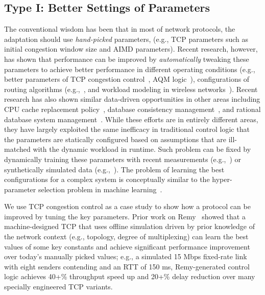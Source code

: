 \subsection{Type I: Better Settings of Parameters}

The conventional wisdom has been that in most of network protocols, 
the adaptation should use {\em hand-picked} parameters, (e.g., TCP parameters 
such as initial congestion window size and AIMD parameters).
Recent research, however, has shown that performance
can be improved by {\em automatically} tweaking these parameters 
to achieve better performance in different operating conditions
(e.g., better parameters of TCP congestion control~\cite{remy,googleinitwindow}, 
AQM logic~\cite{shah2016sam,lin2015kemy}), configurations of routing algorithms 
(e.g.,~\cite{sharma2017machine}, and workload modeling in wireless 
networks~\cite{alsheikh2014machine}).
Recent research has also shown similar data-driven opportunities 
in other areas including CPU cache replacement policy~\cite{calvinlin-cache},
database consistency management~\cite{aaron-cidr}, and 
rational database system management~\cite{andypavlo-rbsm}.
While these efforts are in entirely different areas, they have largely 
exploited the same inefficacy in traditional
control logic that the parameters are statically configured 
based on assumptions that are ill-matched with the dynamic workload 
in runtime.  
Such problem can be fixed by dynamically training
these parameters with recent measurements
(e.g.,~\cite{calvinlin-cache}) or synthetically simulated data (e.g.,~\cite{remy}).
The problem of learning the best configurations
for a complex system is conceptually similar to the 
hyper-parameter selection problem in machine learning~\cite{ml101}.

\noindent\underline{}
We use TCP congestion control as a case study to show
how a protocol can be improved by tuning the key parameters.
Prior work on Remy~\cite{remy} showed that a machine-designed 
TCP that uses offline simulation driven by prior  knowledge of the 
network context (e.g., topology, degree of multiplexing) can learn 
the best values of some key constants and achieve significant 
performance improvement over today's manually picked values; 
e.g., a simulated 15 Mbps fixed-rate link with eight senders 
contending and an RTT of 150 ms, Remy-generated control logic achieves 
40+\% throughput speed up and 20+\% delay reduction over many 
specially engineered TCP variants.



